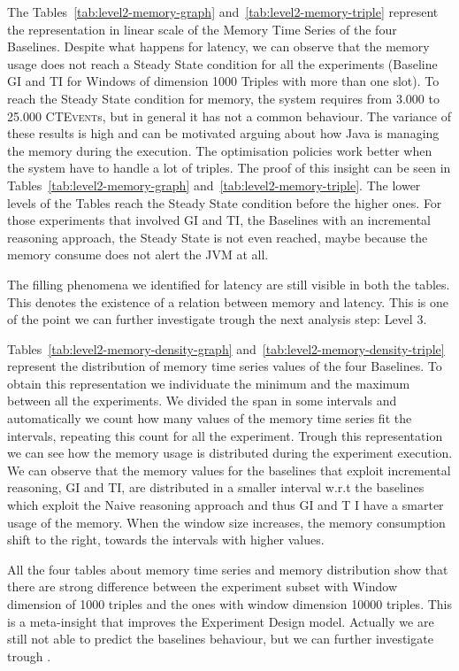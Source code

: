 The Tables~\ref{tab:level2-memory-graph} and~\ref{tab:level2-memory-triple} represent the  representation in linear scale of the Memory Time Series of the four Baselines. Despite what happens for latency, we can observe that the memory usage does not reach a Steady State condition for all the experiments (Baseline GI and TI for Windows of dimension 1000 Triples with more than one slot).  To reach the Steady State condition for memory, the system requires from 3.000 to 25.000 \textsc{CTEvent}s, but in general it has not a common behaviour. The variance of these results is high and can be motivated arguing about how Java is managing the memory during the execution. The optimisation policies work better when the system have to handle a lot of triples. The proof of this insight can be seen in Tables~\ref{tab:level2-memory-graph} and~\ref{tab:level2-memory-triple}. The lower levels of the Tables reach the Steady State condition before the higher ones. For those experiments that involved GI and TI, the Baselines with an incremental reasoning approach, the Steady State is not even reached, maybe because the memory consume does not alert the JVM at all. 

The filling phenomena we identified for latency are still visible in both the tables. This denotes the existence of a relation between memory and latency. This is one of the point we can further investigate trough the next analysis step: Level 3.

Tables~\ref{tab:level2-memory-density-graph} and~\ref{tab:level2-memory-density-triple} represent the distribution of memory time series values of the four Baselines. To obtain this representation we individuate the minimum and the maximum between all the experiments. We divided the span in some intervals and automatically we count how many values of the memory time series fit the intervals, repeating this count for all the experiment. Trough this representation we can see how the memory usage is distributed during the experiment execution. We can observe that the memory values for the baselines that exploit incremental reasoning, GI and TI, are distributed in a smaller interval w.r.t the baselines which exploit the Naive reasoning approach and thus GI and T I have a smarter usage of the memory. When the window size increases, the memory consumption shift to the right, towards the intervals with higher values.

All the four tables about memory time series and memory distribution show that there are strong difference between the experiment subset with Window dimension of 1000  triples and the ones with window dimension 10000 triples. This is a meta-insight that improves the Experiment Design model. Actually we are still not able to predict the baselines behaviour, but we can further investigate trough \namens.

